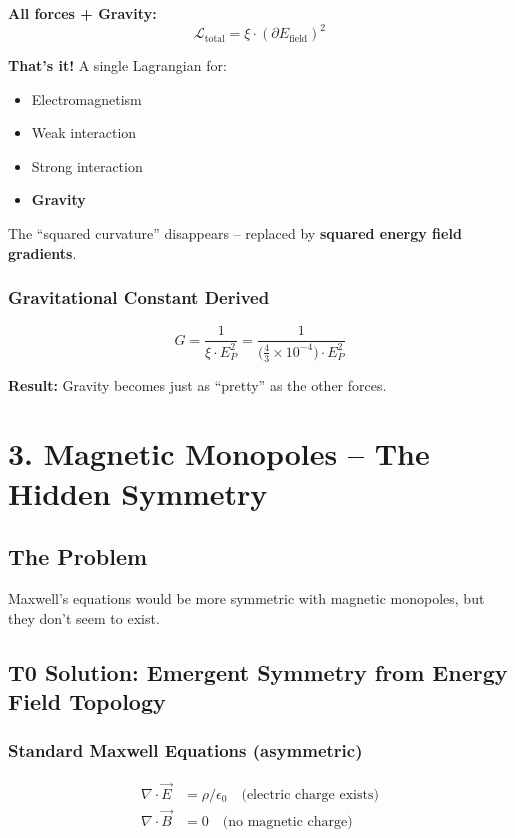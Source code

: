 	\textbf{All forces + Gravity:}
	\[
	\boxed{\mathcal{L}_{\text{total}} = \xi \cdot (\partial E_{\text{field}})^2}
	\]
	
	\textbf{That's it!} A single Lagrangian for:
	\begin{itemize}
		\item Electromagnetism
		\item Weak interaction
		\item Strong interaction
		\item \textbf{Gravity}
	\end{itemize}
	
	The ``squared curvature'' disappears – replaced by \textbf{squared energy field gradients}.
	
	\subsubsection*{Gravitational Constant Derived}
	\[
	G = \frac{1}{\xi \cdot E_P^2} = \frac{1}{\bigl(\frac{4}{3} \times 10^{-4}\bigr) \cdot E_P^2}
	\]
	
	\textbf{Result:} Gravity becomes just as ``pretty'' as the other forces.
	
	
	
	\section*{3. Magnetic Monopoles – The Hidden Symmetry}
	
	\subsection*{The Problem}
	Maxwell's equations would be more symmetric with magnetic monopoles, but they don't seem to exist.
	
	\subsection*{T0 Solution: Emergent Symmetry from Energy Field Topology}
	
	\subsubsection*{Standard Maxwell Equations (asymmetric)}
	\begin{align*}
		\nabla \cdot \vec{E} &= \rho/\epsilon_0 \quad \text{(electric charge exists)} \\
		\nabla \cdot \vec{B} &= 0 \quad \text{(no magnetic charge)}
	\end{align*}
	
